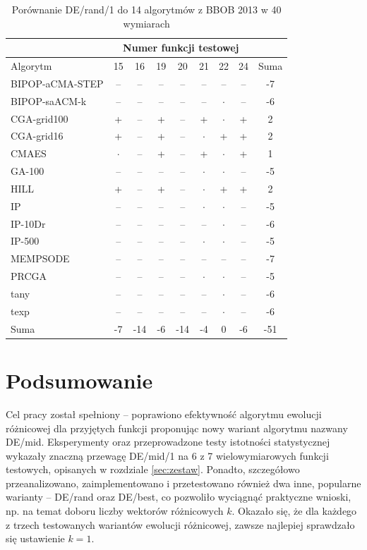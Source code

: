 \documentclass[a4paper,onecolumn,oneside,12pt,wide,floatssmall]{mwrep}
\theoremstyle{definition}
\theoremstyle{plain}%
\theoremstyle{remark}
\begin{document}
\begin{table}[H]
\centering
\begin{tabular}{ | l | c | c | c | c | c | c | c | c | }
\hline		 & \multicolumn{7}{c|}{Numer funkcji testowej} & \\  \hline
Algorytm         &15& 16& 19& 20& 21& 22& 24 & Suma \\  \hline
BIPOP-aCMA-STEP	 & -- & -- & -- & -- & -- & -- & -- & -7 \\
BIPOP-saACM-k	 & -- & -- & -- & -- & -- & $\cdot$ & -- & -6 \\
CGA-grid100	 & + & -- & + & -- & + & $\cdot$ & + & 2 \\
CGA-grid16	 & + & -- & + & -- & $\cdot$ & + & + & 2\\
CMAES	 & $\cdot$ & -- & + & -- & + & $\cdot$ & + & 1 \\
GA-100	 & -- & -- & -- & -- & $\cdot$ & $\cdot$ & -- & -5 \\
HILL	 & + & -- & + & -- & $\cdot$ & + & + & 2 \\
IP	 & -- & -- & -- & -- & $\cdot$ & $\cdot$ & -- & -5 \\
IP-10Dr	 & -- & -- & -- & -- & -- & $\cdot$ & -- & -6 \\
IP-500	 & -- & -- & -- & -- & $\cdot$ & $\cdot$ & -- & -5\\
MEMPSODE	 & -- & -- & -- & -- & -- & -- & -- & -7 \\
PRCGA	 & -- & -- & -- & -- & $\cdot$ & $\cdot$ & -- & -5\\
tany	 & -- & -- & -- & -- & -- & $\cdot$ & -- & -6 \\
texp	 & -- & -- & -- & -- & -- & $\cdot$ & -- & -6 \\ \hline
Suma     & -7 & -14 & -6 & -14 & -4 & 0 & -6 & -51 \\ \hline
\end{tabular}
\caption{Porównanie DE/rand/1 do 14 algorytmów z BBOB 2013 w 40 wymiarach}
\label{table:bbob2013rand40}
\end{table}

\chapter{Podsumowanie}

Cel pracy został spełniony -- poprawiono efektywność algorytmu ewolucji różnicowej dla przyjętych funkcji
proponując nowy wariant algorytmu nazwany DE/mid. Eksperymenty oraz przeprowadzone testy istotności 
statystycznej wykazały znaczną przewagę DE/mid/1 na 6 z 7 
wielowymiarowych funkcji testowych, opisanych w rozdziale \ref{sec:zestaw}. 
Ponadto, szczegółowo przeanalizowano, zaimplementowano 
i przetestowano również dwa inne, popularne warianty -- DE/rand oraz DE/best, co pozwoliło wyciągnąć 
praktyczne wnioski, np. na temat doboru liczby wektorów różnicowych $k$.
Okazało się, że dla każdego z trzech testowanych wariantów ewolucji różnicowej, zawsze
najlepiej sprawdzało się ustawienie $k = 1$.
\end{document}

